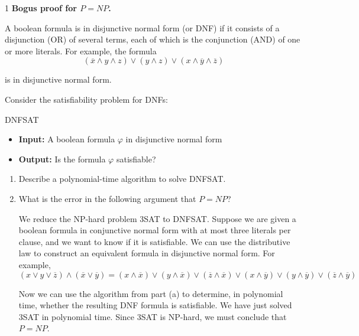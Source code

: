 \documentclass[12pt]{article}
\begin{document}


\begin{problem}{1}
\textbf{Bogus proof for \(P = NP\).}

A boolean formula is in disjunctive normal form (or DNF) if it consists of a disjunction (OR) of several terms, each of which is the conjunction (AND) of one or more literals. For example, the formula
    \[(\overline{x} \wedge y \wedge z) \vee ( y \wedge z) \vee (x \wedge \overline{y} \wedge \overline{z})\]

is in disjunctive normal form.

Consider the satisfiability problem for DNFs:

\begin{tcolorbox}
\textsc{DNFSAT}
\begin{itemize}
    \item \textbf{Input:} A boolean formula \(\varphi\) in disjunctive normal form
    \item \textbf{Output:} Is the formula \(\varphi\) satisfiable?
\end{itemize}
\end{tcolorbox}

\begin{enumerate}
    \item[(a)] Describe a polynomial-time algorithm to solve \textsc{DNFSAT}.

    \item[(b)] What is the error in the following argument that \(P = NP\)?

    \begin{tcolorbox}
        We reduce the NP-hard problem \textsc{3SAT} to \textsc{DNFSAT}. Suppose we are given a boolean formula in conjunctive normal form with at most three literals per clause, and we want to know if it is satisfiable. We can use the distributive law to construct an equivalent formula in disjunctive normal form. For example,
        \[({x} \vee y \vee \overline{z}) \wedge ( \overline{x} \vee \overline{y}) = (x \wedge \overline{x}) \vee (y \wedge \overline{x}) \vee (\overline{z} \wedge \overline{x}) \vee (x \wedge \overline{y}) \vee ( y \wedge \overline{y}) \vee (\overline{z} \wedge \overline{y})\]
        
        Now we can use the algorithm from part (a) to determine, in polynomial time, whether the resulting DNF formula is satisfiable. We have just solved \textsc{3SAT} in polynomial time. Since \textsc{3SAT} is NP-hard, we must conclude that \(P = NP\).
    \end{tcolorbox}
\end{enumerate}
\end{problem}
\end{document}
